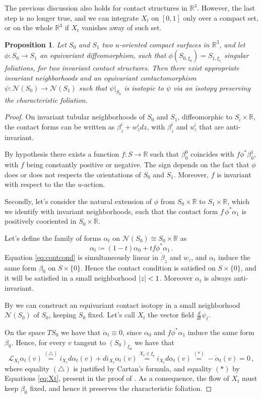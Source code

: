 \documentclass[a4paper, 11pt]{amsart}
\theoremstyle{plain}
\newtheorem{prop}{Proposition}[section]
\theoremstyle{definition}
\newcommand{\R}{\mathbb{R}}
\newcommand{\Lie}{\mathcal{L}}
\newcommand{\NN}{\mathcal{N}}
\DeclarePairedDelimiter{\abs}{\lvert}{\rvert}
\begin{document}
The previous discussion also holds for contact structures in $\R^3$. However, the last step is no longer true, and we can integrate $X_t$ on $[0,1]$ only over a compact set, or on the whole $\R^3$ if $X_t$ vanishes away of such set.
\begin{prop}\label{EGiroux}
	Let $S_0$ and $S_1$ two  $u$-oriented compact surfaces in $\R^3$, and let $\phi \colon S_0 \to S_1$ an equivariant diffeomorphism, such that $\phi(S_{0,\xi_0}) = S_{1,\xi_1}$ singular foliations, for two invariant contact structures. Then there exist appropriate invariant neighborhoods and an equivariant contactomorphism $\psi \colon \NN(S_0) \to \NN(S_1)$ such that $\psi|_{S_0}$ is isotopic to $\psi$ via an isotopy preserving the characteristic foliation.
\end{prop}
\begin{proof}
	On invariant tubular neighborhoods of $S_0$ and $S_1$, diffeomorphic to $S_i \times \R$, the contact forms can be written as $\beta_z^i + w_z^idz$, with $\beta_z^i$ and $u_z^i$ that are anti-invariant.
	
	By hypothesis there exists a function  $f \colon S \to \R$ such that $\beta_0^0$ coincides with $f \phi^*\beta_0^1$, with $f$ being constantly positive or negative. The sign depends on the fact that $\phi$ does or does not respects the orientations of $S_0$ and $S_1$. Moreover, $f$ is invariant with respect to the the $u$-action. 
	
	Secondly, let's consider the natural extension of $\phi$ from $S_0 \times \R$ to $S_1 \times \R$, which we identify with invariant neighborhoods, such that the contact form $f\,\phi^*\alpha_1$ is positively cooriented in $S_0 \times \R$.
	
	Let's define the family of forms $\alpha_t$ on $\NN(S_0) \cong  S_0 \times \R$ as
	\[
		\alpha_t \coloneqq (1-t)\alpha_0 + tf \phi^*\alpha_1\,.
	\]
	Equation \eqref{eq:contcond} is simultaneously linear in $\dot{\beta}_z$ and $w_z$, and $\alpha_t$ induce the same form $\beta_0$ on $S \times \{0\}$. Hence the contact condition is satisfied on $S \times \{0\}$, and it will be satisfied in a small neighborhood $\abs{z} < 1$. Moreover $\alpha_t$ is always anti-invariant.
	
	By  we can construct an equivariant contact isotopy in a small neighborhood $\NN(S_0)$ of $S_0$, keeping $S_0$ fixed. Let's call $X_t$ the vector field $\tfrac{d}{dt}\psi_t$.
	
	On the space $TS_0$ we have that $\dot{\alpha}_t \equiv 0$, since $\alpha_0$ and $f\phi^*\alpha_1$ induce the same form $\beta_0$. Hence, for every $v$ tangent to $(S_0)_{\xi_0}$ we have that
	\[
		\Lie_{X_t}\alpha_t(v) \overset{(\triangle)}{=} i_{X_t}d\alpha_t(v) + di_{X_t}\alpha_t(v) \overset{X_t \in \xi_t}{=} i_{X_t}d\alpha_t(v) \overset{(\ast)}{=} -\dot{\alpha}_t(v) = 0\,,
	\]
	where equality $(\triangle)$ is justified by Cartan's formula, and equality $(\ast)$ by Equations \eqref{eq:Xt}, present in the proof of . As a consequence, the flow of $X_t$ must keep $\beta_0$ fixed, and hence it preserves the characteristic foliation.
	

\end{proof}
\end{document}

